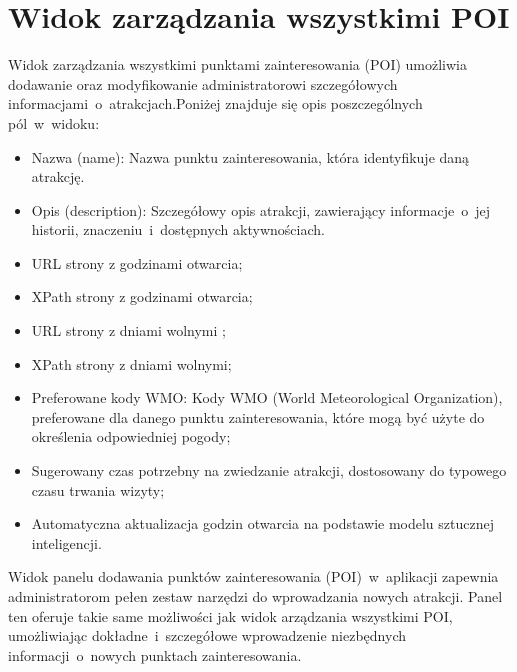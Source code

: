 \section{Widok zarządzania wszystkimi POI}
\label{sec:manage}
Widok zarządzania wszystkimi punktami zainteresowania (POI) umożliwia dodawanie oraz modyfikowanie administratorowi 
szczegółowych informacjami~o~atrakcjach.\newline Poniżej znajduje się opis poszczególnych pól~w~widoku:
\begin{itemize}
    \item Nazwa (name): Nazwa punktu zainteresowania, która identyfikuje daną atrakcję.
    \item Opis (description): Szczegółowy opis atrakcji, zawierający informacje~o~jej historii, znaczeniu~i~dostępnych aktywnościach.
    \item URL strony z godzinami otwarcia;
    \item XPath strony z godzinami otwarcia;
    \item URL strony z dniami wolnymi ;
    \item XPath strony z dniami wolnymi;
    \item  Preferowane kody WMO: Kody WMO (World Meteorological Organization), preferowane dla danego punktu zainteresowania, które mogą być użyte do określenia odpowiedniej pogody;
    \item  Sugerowany czas potrzebny na zwiedzanie atrakcji, dostosowany do typowego czasu trwania wizyty;
    \item Automatyczna aktualizacja godzin otwarcia na podstawie modelu sztucznej inteligencji.
\end{itemize}

Widok panelu dodawania punktów zainteresowania (POI)~w~aplikacji zapewnia administratorom pełen zestaw narzędzi do wprowadzania nowych atrakcji. 
Panel ten oferuje takie same możliwości jak widok arządzania wszystkimi POI, umożliwiając dokładne~i~szczegółowe wprowadzenie 
niezbędnych informacji~o~nowych punktach zainteresowania.


